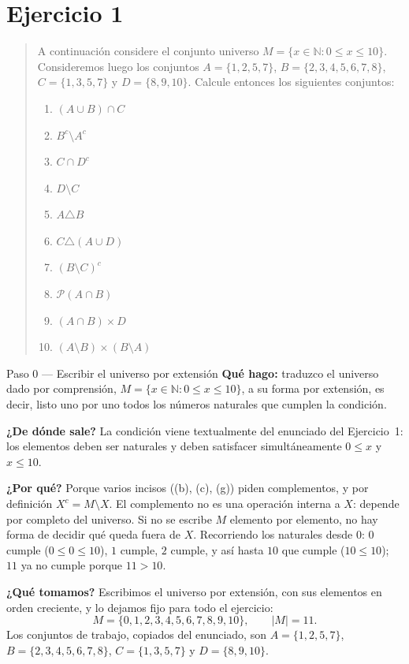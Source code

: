 \documentclass[11pt]{article}
\begin{document}
\section*{Ejercicio 1}

\begin{quote}
A continuación considere el conjunto universo $M=\{x\in\mathbb{N}: 0\le x\le 10\}$.
Consideremos luego los conjuntos $A=\{1,2,5,7\}$, $B=\{2,3,4,5,6,7,8\}$, $C=\{1,3,5,7\}$ y
$D=\{8,9,10\}$. Calcule entonces los siguientes conjuntos:

\begin{enumerate}[label=(\alph*),leftmargin=*]
	\item $(A\cup B)\cap C$
	\item $B^{c}\setminus A^{c}$
	\item $C\cap D^{c}$
	\item $D\setminus C$
	\item $A\triangle B$
	\item $C\triangle(A\cup D)$
	\item $(B\setminus C)^{c}$
	\item $\mathcal{P}(A\cap B)$
	\item $(A\cap B)\times D$
	\item $(A\setminus B)\times(B\setminus A)$
\end{enumerate}
\end{quote}

\begin{paso}{Paso 0 --- Escribir el universo por extensión}
\textbf{Qué hago:} traduzco el universo dado por comprensión,
$M=\{x\in\mathbb{N}: 0\le x\le 10\}$, a su forma por extensión, es decir, listo uno por uno
todos los números naturales que cumplen la condición.

\textbf{¿De dónde sale?} La condición viene textualmente del enunciado del Ejercicio~1: los
elementos deben ser naturales y deben satisfacer simultáneamente $0\le x$ y $x\le 10$.

\textbf{¿Por qué?} Porque varios incisos ((b), (c), (g)) piden complementos, y por definición
$X^{c}=M\setminus X$. El complemento no es una operación interna a $X$: depende por completo
del universo. Si no se escribe $M$ elemento por elemento, no hay forma de decidir qué queda
fuera de $X$. Recorriendo los naturales desde $0$: $0$ cumple ($0\le 0\le 10$), $1$ cumple,
$2$ cumple, y así hasta $10$ que cumple ($10\le 10$); $11$ ya no cumple porque $11>10$.

\textbf{¿Qué tomamos?} Escribimos el universo por extensión, con sus elementos en orden
creciente, y lo dejamos fijo para todo el ejercicio:
\[
M=\{0,1,2,3,4,5,6,7,8,9,10\},\qquad |M|=11.
\]
Los conjuntos de trabajo, copiados del enunciado, son
$A=\{1,2,5,7\}$, $B=\{2,3,4,5,6,7,8\}$, $C=\{1,3,5,7\}$ y $D=\{8,9,10\}$.
\end{paso}
\end{document}
